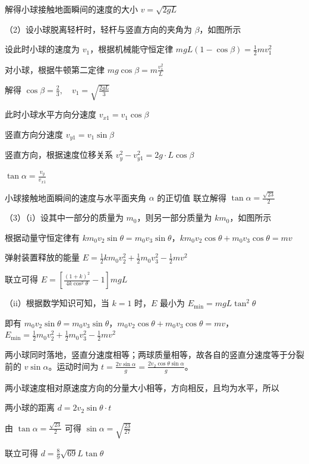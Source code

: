 \documentclass[\gkver]{gaokaozhenti}
\begin{document}
\begin{enumerate}
{解得小球接触地面瞬间的速度的大小 $v = \sqrt{2gL}$

（2）设小球脱离轻杆时，轻杆与竖直方向的夹角为 $\beta$，如图所示


设此时小球的速度为 $v_{1}$，根据机械能守恒定律
$mgL(1-\cos\beta)=\frac{1}{2}mv_{1}^{2}$

对小球，根据牛顿第二定律
$mg\cos\beta=m\frac{v_{1}^{2}}{L}$

解得 $\cos\beta=\frac{2}{3},\quad v_{1}=\sqrt{\frac{2gL}{3}}$

此时小球水平方向分速度 $v_{x1}=v_{1}\cos\beta$

竖直方向分速度 $v_{y1}=v_{1}\sin\beta$

竖直方向，根据速度位移关系 $v_{y}^{2}-v_{y1}^{2}=2g \cdot L\cos\beta$

$\tan\alpha=\frac{v_{y}}{v_{x1}}$

小球接触地面瞬间的速度与水平面夹角 $\alpha$ 的正切值
联立解得 $\tan\alpha=\frac{\sqrt{23}}{2}$

（3）（i）设其中一部分的质量为 $m_{0}$，则另一部分质量为 $km_{0}$，如图所示


根据动量守恒定律有 $km_{0}v_{2}\sin\theta=m_{0}v_{3}\sin\theta$，$km_{0}v_{2}\cos\theta+m_{0}v_{3}\cos\theta=mv$

弹射装置释放的能量
$E=\frac{1}{2}km_{0}v_{2}^{2}+\frac{1}{2}m_{0}v_{3}^{2}-\frac{1}{2}mv^{2}$

联立可得 $E = \left[\frac{(1 + k)^{2}}{4k\cos^{2}\theta} - 1\right]mgL$

（ii）根据数学知识可知，当 $k=1$ 时，$E$ 最小为 $E_{\min}=mgL\tan^{2}\theta$

即有 $m_0v_2\sin\theta=m_0v_3\sin\theta$，$m_0v_2\cos\theta+m_0v_3\cos\theta=mv$，
$E_{\min}=\frac{1}{2}m_0v_2^2+\frac{1}{2}m_0v_3^2-\frac{1}{2}mv^2$

两小球同时落地，竖直分速度相等；两球质量相等，故各自的竖直分速度等于分裂前的 $v\sin\alpha$。运动时间为
$t=\frac{2v\sin\alpha}{g}=\frac{2v_{2}\cos\theta\sin\alpha}{g}$。

两小球速度相对原速度方向的分量大小相等，方向相反，且均为水平，所以

两小球的距离 $d = 2v_{2} \sin \theta \cdot t$

由 $\tan\alpha=\frac{\sqrt{23}}{2}$ 可得 $\sin\alpha=\sqrt{\frac{23}{27}}$

联立可得 $d=\frac{8}{9}\sqrt{69}L\tan\theta$
}
\end{enumerate}
\end{document}
